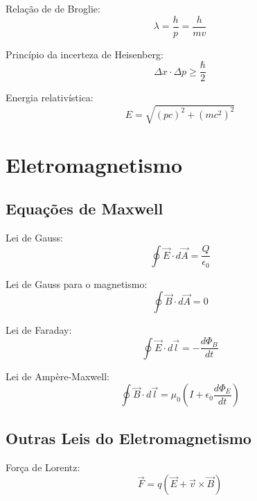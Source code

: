 Relação de de Broglie:
\begin{equation}
\lambda = \frac{h}{p} = \frac{h}{mv}
\end{equation}

Princípio da incerteza de Heisenberg:
\begin{equation}
\Delta x \cdot \Delta p \geq \frac{\hbar}{2}
\end{equation}

Energia relativística:
\begin{equation}
E = \sqrt{(pc)^2 + (mc^2)^2}
\end{equation}


\section{Eletromagnetismo}

\subsection{Equações de Maxwell}

Lei de Gauss:
\begin{equation}
\oint \vec{E} \cdot d\vec{A} = \frac{Q}{\epsilon_0}
\end{equation}

Lei de Gauss para o magnetismo:
\begin{equation}
\oint \vec{B} \cdot d\vec{A} = 0
\end{equation}

Lei de Faraday:
\begin{equation}
\oint \vec{E} \cdot d\vec{l} = -\frac{d\Phi_B}{dt}
\end{equation}

Lei de Ampère-Maxwell:
\begin{equation}
\oint \vec{B} \cdot d\vec{l} = \mu_0\left(I + \epsilon_0\frac{d\Phi_E}{dt}\right)
\end{equation}

\subsection{Outras Leis do Eletromagnetismo}

Força de Lorentz:
\begin{equation}
\vec{F} = q(\vec{E} + \vec{v} \times \vec{B})
\end{equation}

